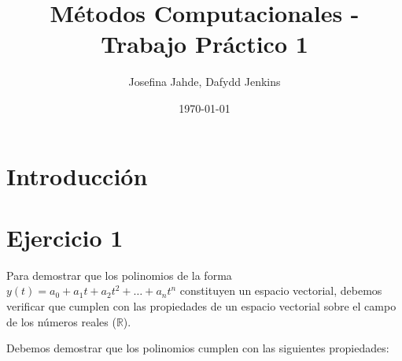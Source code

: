\documentclass{article}
\title{Métodos Computacionales - Trabajo Práctico 1}
\author{Josefina Jahde, Dafydd Jenkins}
\date{\today}
\begin{document}
\maketitle

\section*{Introducción}



\section*{Ejercicio 1}

Para demostrar que los polinomios de la forma \( y(t) = a_0 + a_1 t + a_2 t^2 + \dots + a_n t^n \) constituyen un espacio vectorial, debemos verificar que cumplen con las propiedades de un espacio vectorial sobre el campo de los números reales (\(\mathbb{R}\)).

Debemos demostrar que los polinomios cumplen con las siguientes propiedades:
\end{document}
